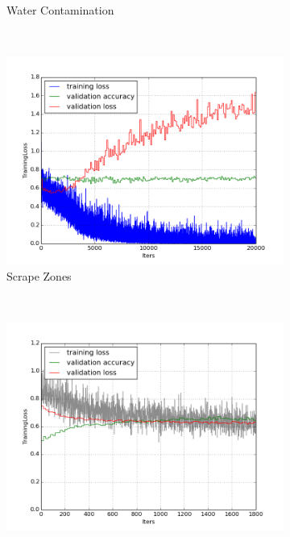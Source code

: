 \documentclass[a4paper,11pt]{article}
\begin{document}
\begin{figure}
\begin{subfigure}[b]{0.3\textwidth}
                \caption{Water Contamination}
                \label{fig:mouse}
        \end{subfigure}%
        ~ %
         \\
        \begin{subfigure}[b]{0.3\textwidth}
                \includegraphics[width=\textwidth]{images/plot_scrape_zone_peel-fine.png}
                \caption{Scrape Zones}
                \label{fig:gull}
        \end{subfigure}%
        ~ %
        \begin{subfigure}[b]{0.3\textwidth}
                \includegraphics[width=\textwidth]{images/plot_scraping_peeling_conv3_bs256_sbl.png}

\end{subfigure}
\end{figure}
\end{document}
